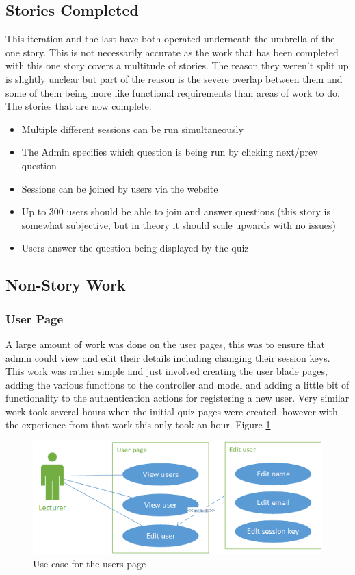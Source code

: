 \subsection{Stories Completed}
This iteration and the last have both operated underneath the umbrella of the one story. This is not necessarily accurate as the work that has been completed with this one story covers a multitude of stories. The reason they weren't split up is slightly unclear but part of the reason is the severe overlap between them and some of them being more like functional requirements than areas of work to do. The stories that are now complete:
\begin{itemize}
	\item Multiple different sessions can be run simultaneously
	\item The Admin specifies which question is being run by clicking next/prev question
	\item Sessions can be joined by users via the website
	\item Up to 300 users should be able to join and answer questions (this story is somewhat subjective, but in theory it should scale upwards with no issues)
	\item Users answer the question being displayed by the quiz
\end{itemize}
\newpage

\subsection{Non-Story Work}
\subsubsection{User Page}
A large amount of work was done on the user pages, this was to ensure that admin could view and edit their details including changing their session keys. This work was rather simple and just involved creating the user blade pages, adding the various functions to the controller and model and adding a little bit of functionality to the authentication actions for registering a new user. Very similar work took several hours when the initial quiz pages were created, however with the experience from that work this only took an hour. Figure \ref{fig:iter-5-users-use-case}

\begin{figure}
	\caption{Use case for the users page}
	\centerline{\includegraphics{Chapter2/Iter-5/iter-5-users-use-case}}
	\label{fig:iter-5-users-use-case}
\end{figure}

